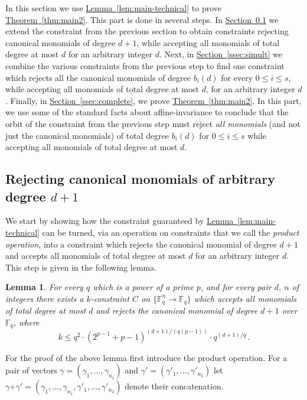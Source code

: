 \documentclass[10pt]{article}
\newtheorem{lemma}[theorem]{Lemma}
\theoremstyle{definition}
\numberwithin{equation}{section}
\newcommand{\expref}[2]{\texorpdfstring{\hyperref[#2]{#1~\ref{#2}}}{#1~\ref{#2}}}
\newcommand{\F}{{\mathbb{F}}}
\begin{document}
In this section we use \expref{Lemma}{lem:main-technical}
to prove
\expref{Theorem}{thm:main2}.
This part is done in several steps.
In \expref{Section}{ssec:arbit degree}
we extend the constraint from the previous section
to obtain constraints rejecting
canonical monomials of degree $d+1$, while accepting all monomials of total degree at most $d$ for an arbitrary integer $d$.
Next, in \expref{Section}{ssec:simult} we combine the various constraints from the previous
step to find one constraint which rejects all the canonical
monomials of degree $b_i(d)$ for every $0\leq i\leq s$, while accepting all
monomials of total degree at most $d$, for an arbitrary integer $d$. Finally, in \expref{Section}{ssec:complete}, we
prove \expref{Theorem}{thm:main2}. In this part, we use
some of the standard facts about affine-invariance to conclude that
the orbit of the constraint from the previous step must reject \emph{all monomials} (and not just the canonical monomials) of total degree $b_i(d)$ for $0\leq i\leq s$ while accepting all monomials of total degree at most $d$.
%
%

\subsection{Rejecting canonical monomials of arbitrary degree
  \texorpdfstring{$d +1$}{d + 1}}
\label{ssec:arbit degree}

We start by showing how the constraint guaranteed by
\expref{Lemma}{lem:main-technical} can be turned, via an operation on
 constraints that we call the \emph{product operation},
 into a constraint which rejects the canonical monomial of degree $d+1$ and accepts all monomials of total degree at most $d$ for an arbitrary integer $d$. This step is given in the following lemma.

\begin{lemma}\label{lem:arbitrary-degree}
For every  $q$ which is a power of a prime $p$, and 
%
for every pair $d$, $n$ of integers %
there exists a $k$-constraint $C$
on $\{\F_q^n \to \F_q\}$ which accepts all monomials
of total degree at most $d$
and rejects the canonical monomial
of degree $d+1$
over $\F_q$, where  \[k \leq q^2 \cdot
\left(2^{p-1}+p-1\right)^{(d+1)/(q(p-1))}
\cdot q^{(d+1)/q}\,.\]
\end{lemma}

For the proof of the above lemma first introduce the product operation. For a pair of vectors $\gamma=(\gamma_1,\ldots,\gamma_{n_1})$ and $\gamma'=(\gamma'_1,\ldots,\gamma'_{n_2})$ let $\gamma \circ \gamma'=
(\gamma_1,\ldots,\gamma_{n_1},\gamma'_1,\ldots,\gamma'_{n_2})$ denote their concatenation.
\end{document}
